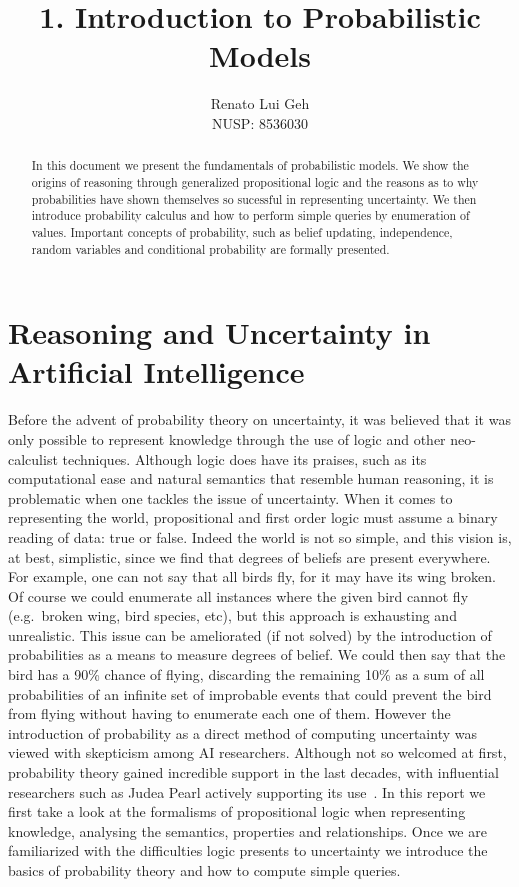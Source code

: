 \documentclass{amsart}
\title[]{1. Introduction to Probabilistic Models}
\author[]{Renato Lui Geh\\NUSP\@: 8536030}
\theoremstyle{plain}
\begin{document}
\begin{abstract}
  In this document we present the fundamentals of probabilistic models. We show the origins of
  reasoning through generalized propositional logic and the reasons as to why probabilities have
  shown themselves so sucessful in representing uncertainty. We then introduce probability calculus
  and how to perform simple queries by enumeration of values. Important concepts of probability,
  such as belief updating, independence, random variables and conditional probability are formally
  presented.
  \vspace*{-2.5em}
\end{abstract}

\maketitle

\section{Reasoning and Uncertainty in Artificial Intelligence}

Before the advent of probability theory on uncertainty, it was believed that it was only possible
to represent knowledge through the use of logic and other neo-calculist techniques. Although logic
does have its praises, such as its computational ease and natural semantics that resemble human
reasoning, it is problematic when one tackles the issue of uncertainty. When it comes to
representing the world, propositional and first order logic must assume a binary reading of data:
true or false. Indeed the world is not so simple, and this vision is, at best, simplistic, since we
find that degrees of beliefs are present everywhere. For example, one can not say that all birds
fly, for it may have its wing broken. Of course we could enumerate all instances where the given
bird cannot fly (e.g.\ broken wing, bird species, etc), but this approach is exhausting and
unrealistic. This issue can be ameliorated (if not solved) by the introduction of probabilities as
a means to measure degrees of belief. We could then say that the bird has a 90\% chance of flying,
discarding the remaining 10\% as a sum of all probabilities of an infinite set of improbable events
that could prevent the bird from flying without having to enumerate each one of them. However the
introduction of probability as a direct method of computing uncertainty was viewed with skepticism
among AI researchers. Although not so welcomed at first, probability theory gained incredible
support in the last decades, with influential researchers such as Judea Pearl actively supporting
its use~\cite{pearl-1988}. In this report we first take a look at the formalisms of propositional
logic when representing knowledge, analysing the semantics, properties and relationships. Once
we are familiarized with the difficulties logic presents to uncertainty we introduce the basics
of probability theory and how to compute simple queries.
\end{document}

